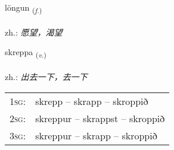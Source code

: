 \documentclass[frontgrid, backgrid]{flacards}\usepackage[]{graphicx}\usepackage[]{xcolor}
\begin{document}
\renewcommand{\flhead}{\vskip5pt \fboxsep=0pt {\small\bfseries\footnotesize Nafnorð | 名词}}
\renewcommand{\fcfoot}{\vskip5pt \fboxsep=0pt \hspace{2pt}{\small\bfseries\footnotesize 3K}}

\renewcommand{\blhead}{\vskip5pt {\small\bfseries\footnotesize Nafnorð | 名词 }}
\renewcommand{\bcfoot}{\vskip5pt \hspace{2pt}{\small\bfseries\footnotesize 3K}}


{löngun \small{\textsubscript{(\textit{f.})}} \\[1ex] %
\textphonetic{[lœiŋkʏn]} \\
zh.: \emph{愿望，渴望} \\  [2ex]
\renewcommand*{\arraystretch}{0.8}
}

\renewcommand{\flhead}{\vskip5pt \fboxsep=0pt {\small\bfseries\footnotesize Sagnorð | 动词}}
\renewcommand{\fcfoot}{\vskip5pt \fboxsep=0pt \hspace{2pt}{\small\bfseries\footnotesize 3K}}

\renewcommand{\blhead}{\vskip5pt {\small\bfseries\footnotesize Sagnorð | 动词 }}
\renewcommand{\bcfoot}{\vskip5pt \hspace{2pt}{\small\bfseries\footnotesize 3K}}


{skreppa \small{\textsubscript{(\textit{v.})}} \\[1ex] %
\textphonetic{[skrɛhpa]} \\
zh.: \emph{出去一下，去一下} \\  [2ex]
\renewcommand*{\arraystretch}{0.8}
\begin{tabular}{p{1cm}l}
\textsc{1sg}: & skrepp -- skrapp -- skroppið \\ 
\textsc{2sg}: & skreppur -- skrappst -- skroppið \\ 
\textsc{3sg}: & skreppur -- skrapp -- skroppið \\ 
\end{tabular}
}
\end{document}
